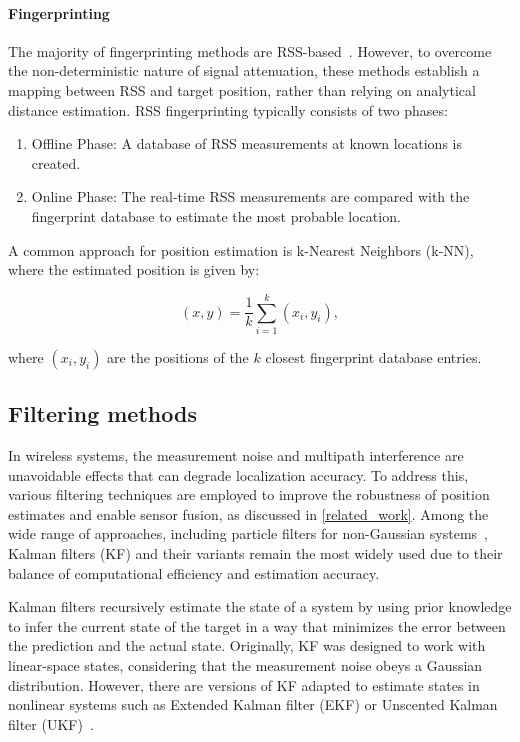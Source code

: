 \paragraph{Fingerprinting}
The majority of fingerprinting methods are RSS-based~\cite{alarifi2016ultra}. However, to overcome the non-deterministic nature of signal attenuation, these methods establish a mapping between RSS and target position, rather than relying on analytical distance estimation. RSS fingerprinting typically consists of two phases:
\begin{enumerate}
    \item Offline Phase: A database of RSS measurements at known locations is created.
    \item Online Phase: The real-time RSS measurements are compared with the fingerprint database to estimate the most probable location.
\end{enumerate}
A common approach for position estimation is k-Nearest Neighbors (k-NN), where the estimated position is given by:

\begin{equation}
(x, y) = \frac{1}{k} \sum_{i=1}^{k} (x_i, y_i),
\end{equation}

where $(x_i, y_i)$ are the positions of the $k$ closest fingerprint database entries.

\subsection{Filtering methods}\label{kalman_theory}
In wireless systems, the measurement noise and multipath interference are unavoidable effects that can degrade localization accuracy. To address this, various filtering techniques are employed to improve the robustness of position estimates and enable sensor fusion, as discussed in \autoref{related_work}. Among the wide range of approaches, including particle filters for non-Gaussian systems~\cite{wang2014particle}, Kalman filters (KF) and their variants remain the most widely used due to their balance of computational efficiency and estimation accuracy.

Kalman filters recursively estimate the state of a system by using prior knowledge to infer the current state of the target in a way that minimizes the error between the prediction and the actual state. Originally, KF was designed to work with linear-space states, considering that the measurement noise obeys a Gaussian distribution. However, there are versions of KF adapted to estimate states in nonlinear systems such as Extended Kalman filter (EKF) or Unscented Kalman filter (UKF)~\cite{wan2000unscented, konatowski2016comparison}.

